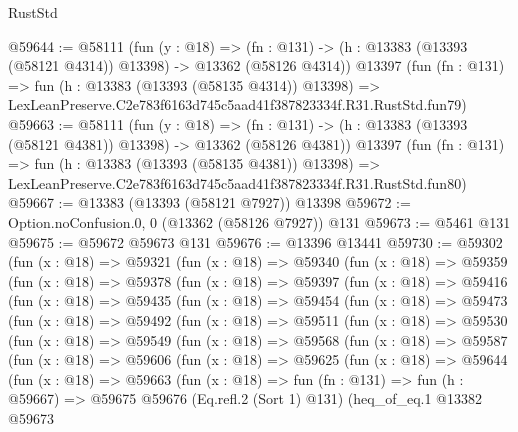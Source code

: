 \begin{lexlean}{RustStd}
\begin{coremodule}
@59644 := @58111
    (fun (y : @18) =>
    (fn : @131) -> (h : @13383 (@13393 (@58121 @4314)) @13398) -> @13362 (@58126 @4314))
    @13397
    (fun (fn : @131) =>
    fun (h : @13383 (@13393 (@58135 @4314)) @13398) =>
    LexLeanPreserve.C2e783f6163d745c5aad41f387823334f.R31.RustStd.fun79)
@59663 := @58111
    (fun (y : @18) =>
    (fn : @131) -> (h : @13383 (@13393 (@58121 @4381)) @13398) -> @13362 (@58126 @4381))
    @13397
    (fun (fn : @131) =>
    fun (h : @13383 (@13393 (@58135 @4381)) @13398) =>
    LexLeanPreserve.C2e783f6163d745c5aad41f387823334f.R31.RustStd.fun80)
@59667 := @13383 (@13393 (@58121 @7927)) @13398
@59672 := Option.noConfusion.{0, 0} (@13362 (@58126 @7927)) @131
@59673 := @5461 @131
@59675 := @59672 @59673 @131
@59676 := @13396 @13441
@59730 := @59302
    (fun (x : @18) =>
    @59321
      (fun (x : @18) =>
      @59340
        (fun (x : @18) =>
        @59359
          (fun (x : @18) =>
          @59378
            (fun (x : @18) =>
            @59397
              (fun (x : @18) =>
              @59416
                (fun (x : @18) =>
                @59435
                  (fun (x : @18) =>
                  @59454
                    (fun (x : @18) =>
                    @59473
                      (fun (x : @18) =>
                      @59492
                        (fun (x : @18) =>
                        @59511
                          (fun (x : @18) =>
                          @59530
                            (fun (x : @18) =>
                            @59549
                              (fun (x : @18) =>
                              @59568
                                (fun (x : @18) =>
                                @59587
                                  (fun (x : @18) =>
                                  @59606
                                    (fun (x : @18) =>
                                    @59625
                                      (fun (x : @18) =>
                                      @59644
                                        (fun (x : @18) =>
                                        @59663
                                          (fun (x : @18) =>
                                          fun (fn : @131) =>
                                          fun (h : @59667) =>
                                          @59675
                                            @59676
                                            (Eq.refl.{2} (Sort 1) @131)
                                            (heq_of_eq.{1}
                                              @13382
                                              @59673

\end{coremodule}
\end{lexlean}
